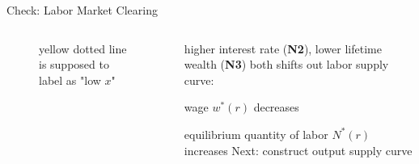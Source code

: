 \documentclass[11pt,aspectratio=169,usenames,dvipsnames]{beamer}
\let\tempone\itemize
\let\temptwo\enditemize
\renewenvironment{itemize}{\tempone\addtolength{\itemsep}{\fill}}{\temptwo}
\begin{document}
\begin{frame}{Check: Labor Market Clearing}
\label{slide:Check__Labor_Market_Clearing}
    \begin{columns}
        \begin{column}{0.5\textwidth}
            \begin{figure}
                \caption{yellow dotted line is supposed to label as "low $ x $"}
            \end{figure}
        \end{column}
        \begin{column}{0.5\textwidth}
            higher interest rate (\textbf{N2}), lower lifetime wealth (\textbf{N3}) both shifts out labor supply curve:
            \begin{itemize}
                \item wage $ w^{*}( r ) $ decreases
                \item equilibrium quantity of labor $ N^{*}( r ) $ increases
            \end{itemize}
            Next: construct output supply curve
        \end{column}
    \end{columns}
\end{frame}
\end{document}
